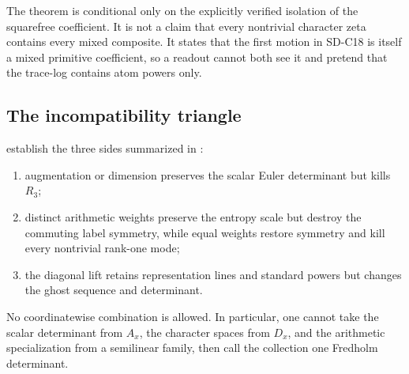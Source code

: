 The theorem is conditional only on the explicitly verified isolation of the
squarefree coefficient.  It is not a claim that every nontrivial character
zeta contains every mixed composite.  It states that the first motion in
SD-C18 is itself a mixed primitive coefficient, so a readout cannot both see
it and pretend that the trace-log contains atom powers only.

\subsection{The incompatibility triangle}

establish the three sides summarized in :

\begin{enumerate}
\item augmentation or dimension preserves the scalar Euler determinant but
  kills $R_3$;
\item distinct arithmetic weights preserve the entropy scale but destroy the
  commuting label symmetry, while equal weights restore symmetry and kill
  every nontrivial rank-one mode;
\item the diagonal lift retains representation lines and standard powers but
  changes the ghost sequence and determinant.
\end{enumerate}

No coordinatewise combination is allowed.  In particular, one cannot take
the scalar determinant from $A_x$, the character spaces from $D_x$, and the
arithmetic specialization from a semilinear family, then call the collection
one Fredholm determinant.
